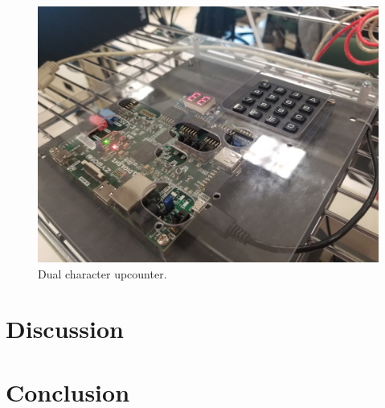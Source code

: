 \documentclass{article}
\begin{document}
    
    \begin{figure}[H]
        \includegraphics[width=115mm]{counter_dual.jpg}
        \caption{Dual character upcounter.}
        \label{fig:counter_dual}
    \end{figure}

\section{Discussion}


\section{Conclusion}
\end{document}
